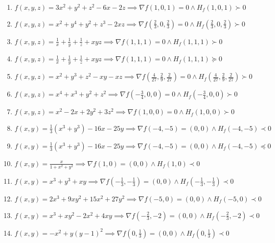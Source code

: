 \documentclass[11pt,a4paper]{article}
\begin{document}
\begin{enumerate}
\item $\displaystyle f(x, y, z) = 3x^{2} + y^{2} + z^{2} - 6x - 2z \implies \nabla f(1, 0, 1) = 0 \land H_{f}(1, 0, 1) \succ 0$
\item $\displaystyle f(x, y, z) = x^{2} + y^{4} + y^{2} + z^{3} - 2xz \implies \nabla f\left( \frac{2}{3}, 0, \frac{2}{3} \right) = 0 \land H_{f}\left( \frac{2}{3}, 0, \frac{2}{3} \right) \succ 0$
\item $\displaystyle f(x, y, z) = \frac{1}{x} + \frac{1}{y} + \frac{1}{z} + xyz \implies \nabla f(1, 1, 1) = 0 \land H_{f}(1, 1, 1) \succ 0$
\item $\displaystyle f(x, y, z) = \frac{1}{x} + \frac{1}{y} + \frac{1}{z} + xyz \implies \nabla f(1, 1, 1) = 0 \land H_{f}(1, 1, 1) \succeq 0$
\item $\displaystyle f(x, y, z) = x^{2} + y^{3} + z^{2} - xy - xz \implies \nabla f\left( \frac{4}{27}, \frac{2}{9}, \frac{2}{27} \right) = 0 \land H_{f}\left( \frac{4}{27}, \frac{2}{9}, \frac{2}{27} \right) \succ 0$
\item $\displaystyle f(x, y, z) = x^{4} + x^{3} + y^{2} + z^{2} \implies \nabla f\left( -\frac{3}{4}, 0, 0 \right) = 0 \land H_{f}\left( -\frac{3}{4}, 0, 0 \right) \succ 0$
\item $\displaystyle f(x, y, z) = x^{2} - 2x + 2y^{2} + 3z^{2} \implies \nabla f(1, 0, 0) = 0 \land H_{f}(1, 0, 0) \succ 0$
\item $\displaystyle f(x, y) = \frac{1}{3}(x^{3} + y^{3}) - 16x - 25y \implies \nabla f(-4, -5) = (0, 0) \land H_{f}(-4, -5) \prec 0$
\item $\displaystyle f(x, y) = \frac{1}{3}(x^{3} + y^{3}) - 16x - 25y \implies \nabla f(-4, -5) = (0, 0) \land H_{f}(-4, -5) \preceq 0$
\item $\displaystyle f(x, y) = \frac{x}{1 + x^{2} + y^{2}} \implies \nabla f(1, 0) = (0, 0) \land H_{f}(1, 0) \prec 0$
\item $\displaystyle f(x, y) = x^{3} + y^{3} + xy \implies \nabla f\left( -\frac{1}{3}, -\frac{1}{3} \right) = (0, 0) \land H_{f}\left( -\frac{1}{3}, -\frac{1}{3} \right) \prec 0$
\item $\displaystyle f(x, y) = 2x^{3} + 9x y^{2} + 15x^{2} + 27y^{2} \implies \nabla f(-5, 0) = (0, 0) \land H_{f}(-5, 0) \prec 0$
\item $\displaystyle f(x, y) = x^{3} + x y^{2} - 2x^{2} + 4xy \implies \nabla f\left( -\frac{2}{3}, -2 \right) = (0, 0) \land H_{f}\left( -\frac{2}{3}, -2 \right) \prec 0$
\item $\displaystyle f(x, y) = -x^{2} + y(y - 1)^{2} \implies \nabla f\left( 0, \frac{1}{3} \right) = (0, 0) \land H_{f}\left( 0, \frac{1}{3} \right) \prec 0$

\end{enumerate}
\end{document}
